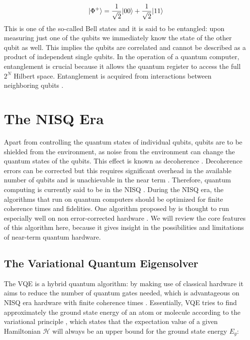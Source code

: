 \begin{equation}\label{eq:Entangled}
	\lvert\Phi^+\rangle = \frac{1}{\sqrt{2}} \lvert00\rangle+ \frac{1}{\sqrt{2}} \lvert11\rangle
\end{equation}
This is one of the so-called Bell states \cite{Nielsen2011} and it is said to be entangled: upon measuring just one of the qubits we immediately know the state of the other qubit as well.
This implies the qubits are correlated and cannot be described as a product of independent single qubits.
In the operation of a quantum computer, entanglement is crucial because it allows the quantum register to access the full $2^N$ Hilbert space.
Entanglement is acquired from interactions between neighboring qubits \cite{Henriet2020}.

\section{The NISQ Era}

Apart from controlling the quantum states of individual qubits, qubits are to be shielded from the environment, as noise from the environment can change the quantum states of the qubits. 
This effect is known as decoherence \cite{DiVincenzo2000}. Decoherence errors can be corrected but this requires significant overhead in the available number of qubits and is unachievable in the near term \cite{Peres1985,Ladd2010}. 
Therefore, quantum computing is currently said to be in the \ac{NISQ} \cite{Preskill2018}.
During the NISQ era, the algorithms that run on quantum computers should be optimized for finite coherence times and fidelities. 
One algorithm proposed by \cite{Peruzzo2014} is thought to run especially well on non error-corrected hardware \cite{McClean2016}. We will review the core features of this algorithm here, because it gives insight in the possibilities and limitations of near-term quantum hardware.

\subsection{The Variational Quantum Eigensolver}

The \ac{VQE} is a hybrid quantum algorithm: by making use of classical hardware it aims to reduce the number of quantum gates needed, which is advantageous on NISQ era hardware with finite coherence times \cite{McClean2016}. 
Essentially, VQE tries to find approximately the ground state energy of an atom or molecule according to the variational principle \cite{Griffiths2004}, which states that the expectation value of a given Hamiltonian $\mathcal{H}$ will always be an upper bound for the ground state energy $E_g$:

